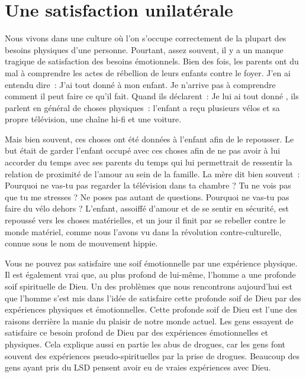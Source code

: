 \section*{Une satisfaction unilatérale}

Nous vivons dans une culture où l'on s'occupe correctement de la plupart
 des besoins physiques d'une personne. Pourtant, assez souvent,
 il y a un manque tragique de satisfaction des besoins émotionnels.
 Bien des fois, les parents ont du mal à comprendre les actes de rébellion
 de leurs enfants contre le foyer. J'en ai entendu dire~:
 \og J'ai tout donné à mon enfant. Je n'arrive pas à comprendre
 comment il peut faire ce qu'il fait. \fg{}
 Quand ils déclarent~: \og Je lui ai tout donné \fg{}, ils parlent en général
 de choses physiques~: l'enfant a reçu plusieurs vélos
 et sa propre télévision, une chaîne hi-fi et une voiture.

Mais bien souvent, ces choses ont été données à l'enfant afin de le repousser.
 Le but était de garder l'enfant occupé avec ces choses afin de ne pas avoir
 à lui accorder du temps avec ses parents
 \ocadr du temps qui lui permettrait de ressentir la relation de proximité
 de l'amour au sein de la famille. La mère dit bien souvent~:
 \og Pourquoi ne vas-tu pas regarder la télévision dans ta chambre ?
 Tu ne vois pas que tu me stresses ? Ne poses pas autant de questions.
 Pourquoi ne vas-tu pas faire du vélo dehors ? \fg{}
 L'enfant, assoiffé d'amour et de se sentir en sécurité,
 est repoussé vers les choses matérielles, et un jour il finit
 par se rebeller contre le monde matériel, comme nous l'avons vu
 dans la révolution contre-culturelle, connue sous le nom de mouvement hippie.

\begin{specialpar}{}
Vous ne pouvez pas satisfaire une soif émotionnelle par une expérience
 physique. Il est également vrai que, au plus profond de lui-même,
 l'homme a une profonde soif spirituelle de Dieu.
 Un des problèmes que nous rencontrons aujourd'hui est que l'homme
 s'est mis dans l'idée de satisfaire cette profonde soif de Dieu
 par des expériences physiques et émotionnelles.
 Cette profonde soif de Dieu est l'une des raisons derrière la manie
 du plaisir de notre monde actuel. Les gens essayent de satisfaire
 ce besoin profond de Dieu par des expériences émotionnelles et physiques.
 Cela explique aussi en partie les abus de drogues,
 car les gens font souvent des expériences pseudo-spirituelles
 par la prise de drogues. Beaucoup des gens ayant pris du LSD
 pensent avoir eu de vraies expériences avec Dieu.
\end{specialpar}


